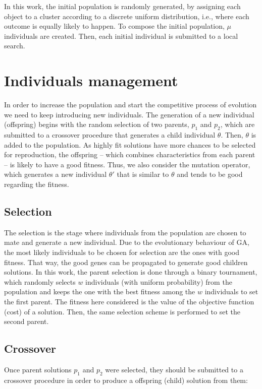 In this work, the initial population is randomly generated, by assigning each object to a cluster according to a discrete uniform distribution, i.e., where each outcome is equally likely to happen. To compose the initial population, $\mu$ individuals are created. Then, each initial individual is submitted to a local search.

\section{Individuals management}
In order to increase the population and start the competitive process of evolution we need to keep introducing new individuals. The generation of a new individual (offspring) begins with the random selection of two parents, $p_1$ and $p_2$, which are submitted to a crossover procedure that generates a child individual $\theta$. Then, $\theta$ is added to the population. As highly fit solutions have more chances to be selected for reproduction, the offspring -- which combines characteristics from each parent -- is likely to have a good fitness. Thus, we also consider the mutation operator, which generates a new individual $\theta'$ that is similar to $\theta$ and tends to be good regarding the fitness.

\subsection{Selection}
The selection is the stage where individuals from the population are chosen to mate and generate a new individual. Due to the evolutionary behaviour of GA, the most likely individuals to be chosen for selection are the ones with good fitness. That way, the good genes can be propagated to generate good children solutions. In this work, the parent selection is done through a binary tournament, which randomly selects $w$ individuals (with uniform probability) from the population and keeps the one with the best fitness among the $w$ individuals to set the first parent. The fitness here considered is the value of the objective function (cost) of a solution. Then, the same selection scheme is performed to set the second parent.

\subsection{Crossover}
Once parent solutions $p_1$ and $p_2$ were selected, they should be submitted to a crossover procedure in order to produce a offspring (child) solution from them:

